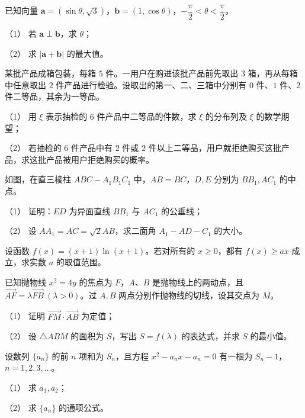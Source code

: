 \begin{question}
已知向量 $\boldsymbol a=(\sin\theta,\sqrt3)$，$\boldsymbol b=(1,\cos\theta)$，$-\dfrac\pi2<\theta<\dfrac\pi2$。

（1） 若 $\boldsymbol a\perp\boldsymbol b$，求 $\theta$；

（2） 求 $|\boldsymbol a+\boldsymbol b|$ 的最大值。

\end{question}
\begin{question}
某批产品成箱包装，每箱 $5$ 件。一用户在购进该批产品前先取出 $3$ 箱，再从每箱中任意取出 $2$ 件产品进行检验。设取出的第一、二、三箱中分别有 $0$ 件、$1$ 件、$2$ 件二等品，其余为一等品。

（1） 用 $\xi$ 表示抽检的 $6$ 件产品中二等品的件数，求 $\xi$ 的分布列及 $\xi$ 的数学期望；

（2） 若抽检的 $6$ 件产品中有 $2$ 件或 $2$ 件以上二等品，用户就拒绝购买这批产品，求这批产品被用户拒绝购买的概率。

\Needspace{0.4\textheight}
\end{question}
\begin{question}
如图，在直三棱柱 $ABC-A_1B_1C_1$ 中，$AB=BC$，$D,E$ 分别为 $BB_1,AC_1$ 的中点。
\nopagebreak[4]
\begin{center}\end{center}
\nopagebreak[4]
（1） 证明：$ED$ 为异面直线 $BB_1$ 与 $AC_1$ 的公垂线；

（2） 设 $AA_1=AC=\sqrt2AB$，求二面角 $A_1-AD-C_1$ 的大小。

\end{question}
\begin{question}
设函数 $f(x)=(x+1)\ln(x+1)$。若对所有的 $x\geqslant0$，都有 $f(x)\geqslant ax$ 成立，求实数 $a$ 的取值范围。

\Needspace{0.4\textheight}
\end{question}
\begin{question}
已知抛物线 $x^2=4y$ 的焦点为 $F$，$A\text{、}B$ 是抛物线上的两动点，且 $\overrightarrow{AF}=\lambda\overrightarrow{FB}\ (\lambda>0)$。过 $A,B$ 两点分别作抛物线的切线，设其交点为 $M$。
\nopagebreak[4]
\begin{center}\end{center}
\nopagebreak[4]
（1） 证明 $\overrightarrow{FM}\cdot\overrightarrow{AB}$ 为定值；

（2） 设 $\triangle ABM$ 的面积为 $S$，写出 $S=f(\lambda)$ 的表达式，并求 $S$ 的最小值。

\end{question}
\begin{question}
设数列 $\{a_n\}$ 的前 $n$ 项和为 $S_n$，且方程 $x^2-a_nx-a_n=0$ 有一根为 $S_n-1$，$n=1,2,3,\ldots$。

（1） 求 $a_1,a_2$；

（2） 求 $\{a_n\}$ 的通项公式。

\end{question}